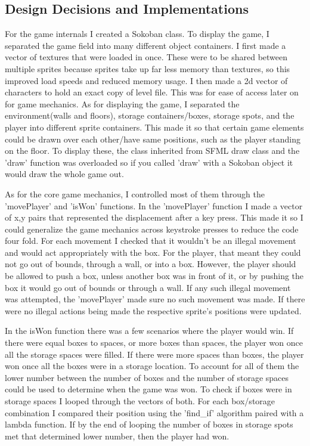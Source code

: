 \subsection{Design Decisions and Implementations}\label{sec:ps2:decisions} %

For the game internals  I created a Sokoban class. To display the game, I separated the game field into many different object containers.
I first made a vector of textures that were loaded in once. 
These were to be shared between multiple sprites because sprites take up far less memory than textures, so this improved load speeds and reduced memory usage.
I then made a 2d vector of characters to hold an exact copy of level file. This was for ease of access later on for game mechanics. 
As for displaying the game, I separated the environment(walls and floors), storage containers/boxes, storage spots, and the player into different sprite containers.
This made it so that certain game elements could be drawn over each other/have same positions, such as the player standing on the floor. 
To display these, the class inherited from SFML draw class and the 'draw' function was overloaded so if you called 'draw' with a Sokoban object it would draw the whole game out.

\bigskip
As for the core game mechanics, I controlled most of them through the 'movePlayer' and 'isWon' functions.
In the 'movePlayer' function I made a vector of x,y pairs that represented the displacement after a key press.
This made it so I could generalize the game mechanics across keystroke presses to reduce the code four fold.
For each movement I checked that it wouldn't be an illegal movement and would act appropriately with the box.
For the player, that meant they could not go out of bounds, through a wall, or into a box.
However, the player should be allowed to push a box, unless another box was in front of it, or by pushing the box it would go out of bounds or through a wall.
If any such illegal movement was attempted, the 'movePlayer' made sure no such movement was made.
If there were no illegal actions being made the respective sprite's positions were updated.

\bigskip
In the isWon function there was a few scenarios where the player would win.
If there were equal boxes to spaces, or more boxes than spaces, the player won once all the storage spaces were filled. 
If there were more spaces than boxes, the player won once all the boxes were in a storage location.
To account for all of them the lower number between the number of boxes and the number of storage spaces could be used to determine when the game was won.
To check if boxes were in storage spaces I looped through the vectors of both. For each box/storage combination I compared their position using the 'find\_if' algorithm paired with a lambda function. 
If by the end of looping the number of boxes in storage spots met that determined lower number, then the player had won. 

